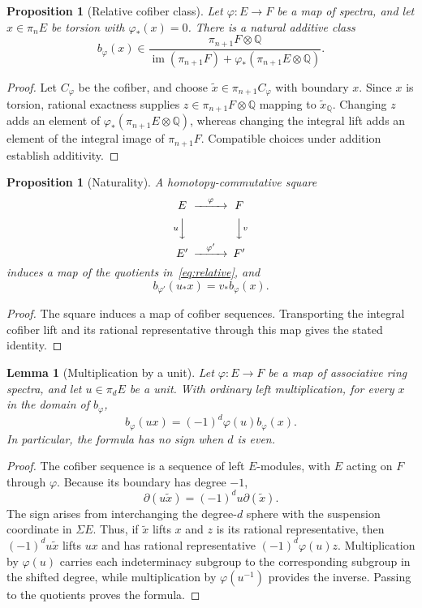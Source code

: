 \documentclass[11pt,a4paper]{amsart}
\newcommand{\Q}{\mathbb Q}
\newcommand{\im}{\operatorname{im}}
\theoremstyle{plain}
\newtheorem{proposition}[theorem]{Proposition}
\newtheorem{lemma}[theorem]{Lemma}
\theoremstyle{definition}
\theoremstyle{remark}
\begin{document}
\begin{proposition}[Relative cofiber class]\label{prop:relative}
Let $\varphi:E\to F$ be a map of spectra, and let $x\in\pi_nE$ be torsion with
$\varphi_*(x)=0$. There is a natural additive class
\begin{equation}\label{eq:relative}
 b_\varphi(x)\in
 \frac{\pi_{n+1}F\otimes\Q}
 {\im(\pi_{n+1}F)+\varphi_*(\pi_{n+1}E\otimes\Q)}.
\end{equation}
\end{proposition}

\begin{proof}
Let $C_\varphi$ be the cofiber, and choose
$\widetilde x\in\pi_{n+1}C_\varphi$ with boundary $x$.
Since $x$ is torsion, rational exactness supplies
$z\in\pi_{n+1}F\otimes\Q$ mapping to $\widetilde x_\Q$.
Changing $z$ adds an element of
$\varphi_*(\pi_{n+1}E\otimes\Q)$, whereas changing the integral lift
adds an element of the integral image of $\pi_{n+1}F$.
Compatible choices under addition establish additivity.
\end{proof}

\begin{proposition}[Naturality]\label{prop:naturality}
A homotopy-commutative square
\[
\begin{CD}
 E @>{\varphi}>> F\\
 @V{u}VV @VV{v}V\\
 E' @>{\varphi'}>> F'
\end{CD}
\]
induces a map of the quotients in~\eqref{eq:relative}, and
\[
 b_{\varphi'}(u_*x)=v_*b_\varphi(x).
\]
\end{proposition}

\begin{proof}
The square induces a map of cofiber sequences. Transporting the
integral cofiber lift and its rational representative through this
map gives the stated identity.
\end{proof}

\begin{lemma}[Multiplication by a unit]\label{lem:unit}
Let $\varphi:E\to F$ be a map of associative ring spectra, and let
$u\in\pi_dE$ be a unit. With ordinary left multiplication, for every
$x$ in the domain of $b_\varphi$,
\[
 b_\varphi(ux)=(-1)^d\varphi(u)b_\varphi(x).
\]
In particular, the formula has no sign when $d$ is even.
\end{lemma}

\begin{proof}
The cofiber sequence is a sequence of left $E$-modules, with $E$
acting on $F$ through $\varphi$. Because its boundary has degree
$-1$,
\[
 \partial(u\widetilde x)=(-1)^d u\partial(\widetilde x).
\]
The sign arises from interchanging the degree-$d$ sphere with the
suspension coordinate in $\Sigma E$. Thus, if $\widetilde x$ lifts
$x$ and $z$ is its rational representative, then
$(-1)^d u\widetilde x$ lifts $ux$ and has rational representative
$(-1)^d\varphi(u)z$. Multiplication by $\varphi(u)$ carries each
indeterminacy subgroup to the corresponding subgroup in the shifted
degree, while multiplication by $\varphi(u^{-1})$ provides the
inverse. Passing to the quotients proves the formula.
\end{proof}
\end{document}
